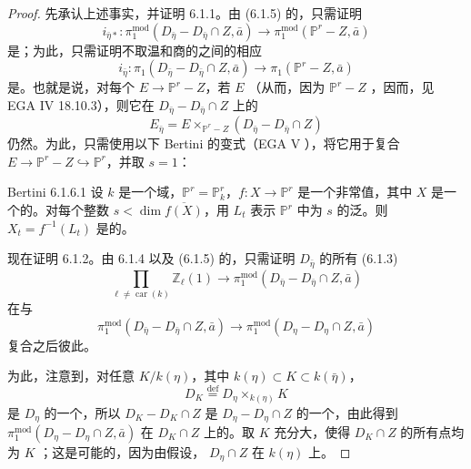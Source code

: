 \begin{proof}
先承认上述事实，并证明 6.1.1。由 (6.1.5) 的，只需证明
\[
i_{\bar\eta*}:\pi_1^{\mathrm{mod}}(D_{\bar\eta}-D_{\bar\eta}\cap Z,\bar a)
\longrightarrow\pi_1^{\mathrm{mod}}(\mathbb P^r-Z,\bar a)
\]
是；为此，只需证明不取温和商的之间的相应
\[
i_{\bar\eta}:\pi_1(D_{\bar\eta}-D_{\bar\eta}\cap Z,\bar a)
\longrightarrow\pi_1(\mathbb P^r-Z,\bar a)
\tag{6.1.6}
\]
是。也就是说，对每个 $E\to\mathbb P^r-Z$，若 $E$ （从而，因为 $\mathbb P^r-Z$ ，因而，见 EGA IV 18.10.3），则它在 $D_{\bar\eta}-D_{\bar\eta}\cap Z$ 上的
\[
E_{\bar\eta}=E\mathbin{\times}_{\mathbb P^r-Z}
(D_{\bar\eta}-D_{\bar\eta}\cap Z)
\]
仍然。为此，只需使用以下 Bertini 的变式（EGA V ），将它用于复合 $E\to\mathbb P^r-Z\hookrightarrow\mathbb P^r$，并取 $s=1$：

\begin{SGAresult}{Bertini }{6.1.6.1}
设 $k$ 是一个域，$\mathbb P^r=\mathbb P_k^r$，$f:X\to\mathbb P^r$ 是一个非常值，其中 $X$ 是一个的。对每个整数 $s<\dim\overline{f(X)}$，用 $L_t$ 表示 $\mathbb P^r$ 中为 $s$ 的泛。则 $X_t=f^{-1}(L_t)$ 是的。
\end{SGAresult}
现在证明 6.1.2。由 6.1.4 以及 (6.1.5) 的，只需证明 $D_{\bar\eta}$ 的所有 (6.1.3)
\[
\prod_{\ell\neq\operatorname{car}(k)}\mathbb Z_\ell(1)
\longrightarrow\pi_1^{\mathrm{mod}}(D_{\bar\eta}-D_{\bar\eta}\cap Z,\bar a)
\tag{6.1.7.1}
\]
在与
\[
\pi_1^{\mathrm{mod}}(D_{\bar\eta}-D_{\bar\eta}\cap Z,\bar a)
\longrightarrow\pi_1^{\mathrm{mod}}(D_\eta-D_\eta\cap Z,\bar a)
\tag{6.1.7.2}
\]
复合之后彼此。

为此，注意到，对任意 $K/k(\eta)$，其中 $k(\eta)\subset K\subset k(\bar\eta)$，
\[
D_K\overset{\mathrm{def}}=D_\eta\times_{k(\eta)}K
\]
是 $D_\eta$ 的一个，所以 $D_K-D_K\cap Z$ 是 $D_\eta-D_\eta\cap Z$ 的一个，由此得到 $\pi_1^{\mathrm{mod}}(D_\eta-D_\eta\cap Z,\bar a)$ 在 $D_K\cap Z$ 上的。取 $K$ 充分大，使得 $D_K\cap Z$ 的所有点均为 $K$ ；这是可能的，因为由假设， $D_\eta\cap Z$ 在 $k(\eta)$ 上。


\end{proof}
